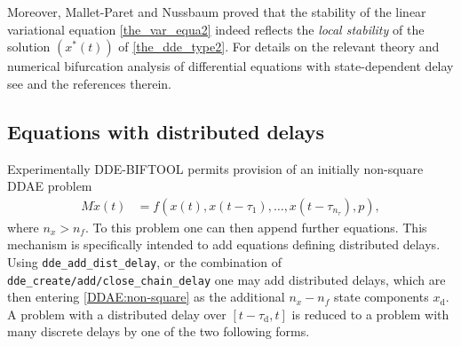 \documentclass[10pt]{scrartcl}
\newcommand{\DDEBIFCODE}{\textsc{DDE-BIFTOOL}}
\newcommand{\blist}[1]{\mbox{\lstinline!#1!}}
\begin{document}

Moreover, Mallet-Paret and Nussbaum \cite{MN11} proved that the
stability of the linear variational equation \eqref{the_var_equa2}
indeed reflects the {\normalfont\itshape local stability} of the solution
$(x^*(t))$ of \cref{the_dde_type2}. 
For details on the relevant theory and numerical bifurcation analysis
of differential equations with state-dependent delay see
\cite{luz01,HKWW06,S17} and the references therein.

\subsection{Equations with distributed delays}
\label{sec:distdelay}
Experimentally \DDEBIFCODE{} permits provision of an initially
non-square DDAE problem
\begin{align}
  \label{DDAE:non-square}
  M \dot x(t)&=f(x(t),x(t-\tau_1),\ldots,x(t-\tau_{n_\tau}),p),
\end{align}
where $n_x>n_f$. To this problem one can then append further
equations. This mechanism is specifically intended to add equations
defining distributed delays. Using \blist{dde_add_dist_delay}, or the
combination of \blist{dde_create/add/close_chain_delay} one may add
distributed delays, which are then entering \eqref{DDAE:non-square} as
the additional $n_x-n_f$ state components $x_\mathrm{d}$. A problem
with a distributed delay over $[t-\tau_\mathrm{d},t]$ is reduced to a
problem with many discrete delays by
one of the two following
forms.
\end{document}
